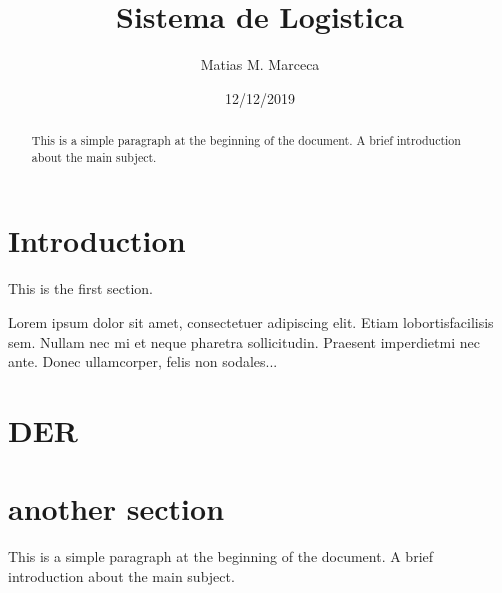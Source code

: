 \documentclass{article}
\title{Sistema de Logistica}
\author{Matias M. Marceca}
\date{12/12/2019}
\begin{document}
\maketitle

\tableofcontents

\section{Introduction}

This is the first section.

Lorem  ipsum  dolor  sit  amet,  consectetuer  adipiscing
elit.   Etiam  lobortisfacilisis sem.  Nullam nec mi et
neque pharetra sollicitudin.  Praesent imperdietmi nec ante.
Donec ullamcorper, felis non sodales...

\section{DER}

  

  \begin{abstract}
  This is a simple paragraph at the beginning of the
  document. A brief introduction about the main subject.
  \end{abstract}

\section{another section}

This is a simple paragraph at the beginning of the
document. A brief introduction about the main subject.
\end{document}
